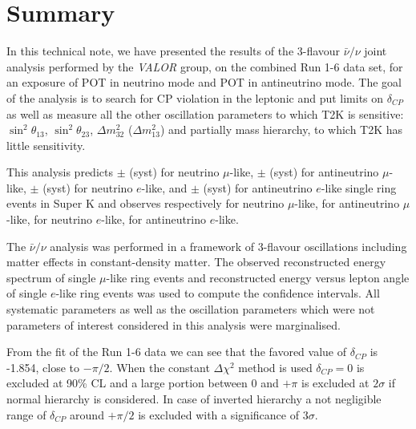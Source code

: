 \clearpage


\section {Summary}
\label{sec:summary}

In this technical note,
we have presented the results of the 3-flavour $\bar{\nu}/\nu$ joint analysis
performed by the {\em VALOR} group,
on the combined Run 1-6 data set,
for an exposure of \TotalPotNu{} POT in neutrino mode
and \TotalPotNuBar{} POT in antineutrino mode. 
The goal of the analysis is to search for CP violation in the leptonic
and put limits on $\delta_{CP}$ as well as 
measure all the other oscillation parameters to which T2K is sensitive:
$\sin^2 \theta_{13}$, $\sin^2 \theta_{23}$, $\Delta m^2_{32}$ ($\Delta m^2_{13}$)
and partially mass hierarchy, to which T2K has little sensitivity.

This analysis predicts 
\NskOscExpectationNumu{} $\pm$ \NskOscExpectationNumuError{} (syst) for neutrino $\mu$-like,
\NskOscExpectationNumuBar{} $\pm$ \NskOscExpectationNumuBarError{} (syst) for antineutrino $\mu$-like,
\NskOscExpectationNue{} $\pm$ \NskOscExpectationNueError{} (syst) for neutrino $e$-like,
and
\NskOscExpectationNueBar{} $\pm$ \NskOscExpectationNueBarError{} (syst) for antineutrino $e$-like
single ring events in Super K
and observes respectively 
\NskObservedNumu{} for neutrino $\mu$-like,
\NskObservedNumuBar{}  for antineutrino $\mu$-like,
\NskObservedNue{}  for neutrino $e$-like,
\NskObservedNueBar{}  for antineutrino $e$-like.

The $\bar{\nu}/\nu$ analysis was performed
in a framework of 3-flavour oscillations including matter effects in constant-density matter.
The observed reconstructed energy spectrum of single $\mu$-like ring events
and reconstructed energy versus lepton angle of single $e$-like ring events
was used to compute the confidence intervals.
All \NSyst{} systematic parameters as well as the oscillation parameters
which were not parameters of interest considered in this analysis were marginalised.

From the fit of the Run 1-6 data we can see that the favored value of $\delta_{CP}$ is -1.854, close to $-\pi/2$.
When the constant $\Delta \chi^2$ method is used $\delta_{CP}=0$ is excluded at 90\% CL
and a large portion between $0$ and $+\pi$ is excluded at $2\sigma$ if normal hierarchy is considered.
In case of inverted hierarchy a not negligible range of $\delta_{CP}$ around $+\pi/2$ is excluded with 
a significance of $3\sigma$.

